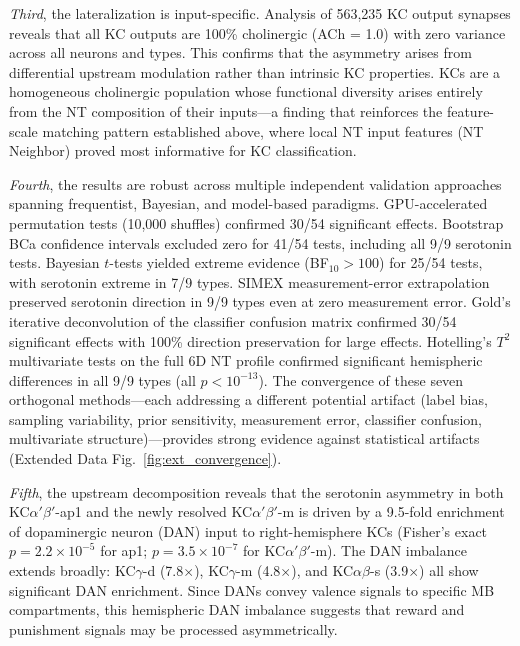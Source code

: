 \documentclass[10pt]{article}
\begin{document}
\textit{Third}, the lateralization is input-specific. Analysis of 563,235 KC output synapses reveals that all KC outputs are 100\% cholinergic (ACh = 1.0) with zero variance across all neurons and types. This confirms that the asymmetry arises from differential upstream modulation rather than intrinsic KC properties. KCs are a homogeneous cholinergic population whose functional diversity arises entirely from the NT composition of their inputs---a finding that reinforces the feature-scale matching pattern established above, where local NT input features (NT Neighbor) proved most informative for KC classification.

\textit{Fourth}, the results are robust across multiple independent validation approaches spanning frequentist, Bayesian, and model-based paradigms. GPU-accelerated permutation tests (10,000 shuffles) confirmed 30/54 significant effects. Bootstrap BCa confidence intervals excluded zero for 41/54 tests, including all 9/9 serotonin tests. Bayesian $t$-tests yielded extreme evidence (BF$_{10} > 100$) for 25/54 tests, with serotonin extreme in 7/9 types. SIMEX measurement-error extrapolation preserved serotonin direction in 9/9 types even at zero measurement error. Gold's iterative deconvolution of the classifier confusion matrix confirmed 30/54 significant effects with 100\% direction preservation for large effects. Hotelling's $T^2$ multivariate tests on the full 6D NT profile confirmed significant hemispheric differences in all 9/9 types (all $p < 10^{-13}$). The convergence of these seven orthogonal methods---each addressing a different potential artifact (label bias, sampling variability, prior sensitivity, measurement error, classifier confusion, multivariate structure)---provides strong evidence against statistical artifacts (Extended Data Fig.~\ref{fig:ext_convergence}).

\textit{Fifth}, the upstream decomposition reveals that the serotonin asymmetry in both KC$\alpha'\beta'$-ap1 and the newly resolved KC$\alpha'\beta'$-m is driven by a 9.5-fold enrichment of dopaminergic neuron (DAN) input to right-hemisphere KCs (Fisher's exact $p = 2.2 \times 10^{-5}$ for ap1; $p = 3.5 \times 10^{-7}$ for KC$\alpha'\beta'$-m). The DAN imbalance extends broadly: KC$\gamma$-d (7.8$\times$), KC$\gamma$-m (4.8$\times$), and KC$\alpha\beta$-s (3.9$\times$) all show significant DAN enrichment. Since DANs convey valence signals to specific MB compartments\cite{aso2014mushroom,modi2020dopamine_kc}, this hemispheric DAN imbalance suggests that reward and punishment signals may be processed asymmetrically.
\end{document}
